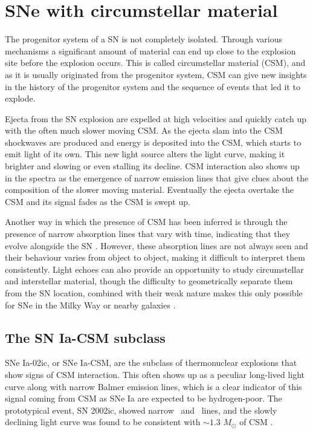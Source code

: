 \documentclass[a4paper,oneside,12pt, class=Latex/Classes/PhDthesisPSnPDF, crop=false]{standalone}
\begin{document}
\section{SNe with circumstellar material}
The progenitor system of a SN is not completely isolated. Through various mechanisms a significant amount of material can end up close to the explosion site before the explosion occurs. This is called circumstellar material (CSM), and as it is usually originated from the progenitor system, CSM can give new insights in the history of the progenitor system and the sequence of events that led it to explode.

Ejecta from the SN explosion are expelled at high velocities and quickly catch up with the often much slower moving CSM. As the ejecta slam into the CSM shockwaves are produced and energy is deposited into the CSM, which starts to emit light of its own. This new light source alters the light curve, making it brighter and slowing or even stalling its decline. CSM interaction also shows up in the spectra as the emergence of narrow emission lines that give clues about the composition of the slower moving material. Eventually the ejecta overtake the CSM and its signal fades as the CSM is swept up.

Another way in which the presence of CSM has been inferred is through the presence of narrow absorption lines that vary with time, indicating that they evolve alongside the SN \citep[e.g., ][]{2013gh_NaID, 2014J_core_deg}. However, these absorption lines are not always seen and their behaviour varies from object to object, making it difficult to interpret them consistently. Light echoes can also provide an opportunity to study circumstellar and interstellar material, though the difficulty to geometrically separate them from the SN location, combined with their weak nature makes this only possible for SNe in the Milky Way or nearby galaxies \citep{Patat_light_echoes, Tycho_Brahe_classif, 2012cg}.


\subsection{The SN Ia-CSM subclass}
\label{Ia_CSM}
SNe Ia-02ic, or SNe Ia-CSM, are the subclass of thermonuclear explosions that show signs of CSM interaction. This often shows up as a peculiar long-lived light curve along with narrow Balmer emission lines, which is a clear indicator of this signal coming from CSM as SNe Ia are expected to be hydrogen-poor. The prototypical event, SN 2002ic, showed narrow \Halpha\ and \Hbeta\ lines, and the slowly declining light curve was found to be consistent with $\sim1.3$ $M_\odot$ of CSM \citep{02ic_H_det, Hamuy_02ic, 02ic_slow_decay, single_degen_CSM_gen}.
\end{document}
